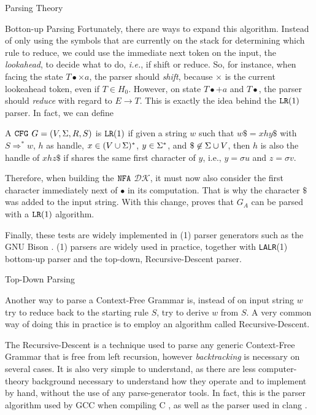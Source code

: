 \begin{section}{Parsing Theory}
\begin{subsection}{Botton-up Parsing}
Fortunately, there are ways to expand this algorithm.
Instead of only using the symbols that are currently on the stack for
determining which rule to reduce, we could use the immediate next
token on the input, the \textit{lookahead}, to decide what to do, \textit{i.e.},
if shift or reduce. So, for instance, when facing the state
$T\bullet \times a$, the parser should \textit{shift}, because
$\times$ is the current lookeahead token, even if $T \in H_0$.
However, on state $T\bullet + a$ and $T\bullet$, the parser should
\textit{reduce} with regard to $E \rightarrow T$. This is exactly the
idea behind the $\texttt{LR}(1)$ parser. In fact, we can define

\begin{definition}
A $\texttt{CFG}$ $G = (V, \Sigma, R, S)$ is $\texttt{LR}(1)$ if given a string
$w$ such that $w\$ = xhy \$$ with $S \Rightarrow^* w$, $h$ as
handle, $x \in (V \cup \Sigma)^*$, $y \in \Sigma^*$, and $ \$ \not\in \Sigma \cup V$,
then $h$ is also the handle of $xhz\$ $ if shares the same first character of $y$, i.e.,
$y = \sigma u$ and $z = \sigma v$.
\end{definition}

Therefore, when building the $\texttt{NFA}$ $\mathcal{DK}$, it must now also
consider the first character immediately next of $\bullet$ in its computation.
That is why the character $\$$ was added to the input string.
With this change, \cite{sipser2012} proves that $G_A$ can be parsed with a
$\texttt{LR}(1)$ algorithm.

Finally, these tests are widely implemented in (1) parser generators
such as the GNU Bison \citep{manual21bison}. (1) parsers are widely
used in practice, together with \texttt{LALR}(1) bottom-up parser and the top-down,
Recursive-Descent parser.

\end{subsection}

\begin{subsection}{Top-Down Parsing}

Another way to parse a Context-Free Grammar is, instead of on input string $w$
try to reduce back to the starting rule $S$, try to derive $w$ from $S$.
A very common way of doing this in practice is to employ an algorithm called
Recursive-Descent.

The Recursive-Descent is a technique used to parse any generic Context-Free
Grammar that is free from left recursion, however \textit{backtracking} is
necessary on several cases. It is also very simple to understand, as there
are less computer-theory background necessary to understand how they operate
and to implement by hand, without the use of any parse-generator tools.
In fact, this is the parser algorithm used by GCC when compiling C \citep{myers_parser}
, as well as the parser used in clang \citep{clang_parser}. 


\end{subsection}
\end{section}
